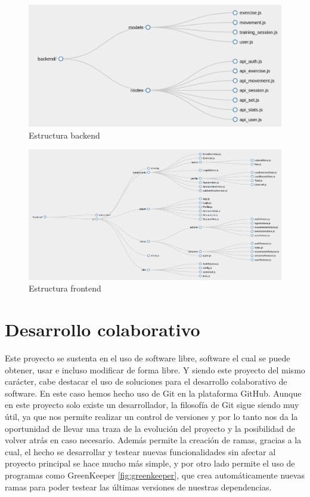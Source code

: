 \begin{figure}
  \begin{center}
    \includegraphics[width=\textwidth]{imagenes/backend.png}
    \caption{Estructura backend}
    \label{fig:backend}
  \end{center}
\end{figure}

\begin{figure}
  \begin{center}
    \includegraphics[width=\textwidth]{imagenes/frontend.png}
    \caption{Estructura frontend}
    \label{fig:frontend}
  \end{center}
\end{figure}


\section{Desarrollo colaborativo}
Este proyecto se sustenta en el uso de software libre, software el cual se puede obtener, usar e incluso modificar de forma libre. Y siendo este proyecto del mismo carácter, cabe destacar el uso de soluciones para el desarrollo colaborativo de software. En este caso hemos hecho uso de Git en la plataforma GitHub. Aunque en este proyecto solo existe un desarrollador, la filosofía de Git sigue siendo muy útil, ya que nos permite realizar un control de versiones y por lo tanto nos da la oportunidad de llevar una traza de la evolución del proyecto y la posibilidad de volver atrás en caso necesario. Además permite la creación de ramas, gracias a la cual, el hecho se desarrollar y testear nuevas funcionalidades sin afectar al proyecto principal se hace mucho más simple, y por otro lado permite el uso de programas como GreenKeeper \ref{fig:greenkeeper}, que crea automáticamente nuevas ramas para poder testear las últimas versiones de nuestras dependencias.


